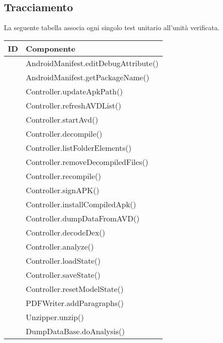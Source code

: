 \subsection{Tracciamento}\label{subsec:tracciamento-unitari}
La seguente tabella associa ogni singolo test unitario all'unità verificata.
\begin{longtable}{ |C{3cm} |C{10.5cm}|}
    \hline
    \textbf{ID} &
    \textbf{Componente} \\\hline
     & AndroidManifest.editDebugAttribute()       \\\hline
     & AndroidManifest.getPackageName()           \\\hline
     & Controller.updateApkPath()                 \\\hline
     & Controller.refreshAVDList()                \\\hline
     & Controller.startAvd()                      \\\hline
     & Controller.decompile()                     \\\hline
     & Controller.listFolderElements()            \\\hline
     & Controller.removeDecompiledFiles()         \\\hline
     & Controller.recompile()                     \\\hline
     & Controller.signAPK()                       \\\hline
     & Controller.installCompiledApk()            \\\hline
     & Controller.dumpDataFromAVD()               \\\hline
     & Controller.decodeDex()                     \\\hline
     & Controller.analyze()                       \\\hline
     & Controller.loadState()                     \\\hline
     & Controller.saveState()                     \\\hline
     & Controller.resetModelState()               \\\hline
     & PDFWriter.addParagraphs()                  \\\hline
     & Unzipper.unzip()                           \\\hline
     & DumpDataBase.doAnalysis()                  \\\hline

\end{longtable}
